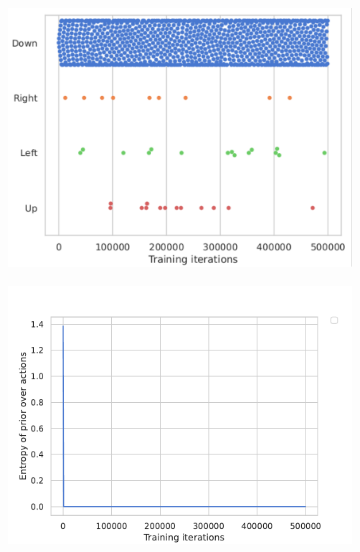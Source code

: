 \documentclass[twoside,11pt]{article}
\providecommand{\DIFaddbegin}{} %
\begin{document}
\DIFaddbegin \begin{figure}[H]
    \centering
    \begin{subfigure}{.4\textwidth}
        \centering
        \includegraphics[draft=false,width=\linewidth]{ActionPicked_efe_3}
        \caption{}\label{fig:action_picked_efe}
    \end{subfigure}%
    \begin{subfigure}{.4\textwidth}
        \centering
        \includegraphics[draft=false,width=\linewidth]{EntropyPriorActions_efe_3}
        \caption{}\label{fig:entropy_action_efe}
    \end{subfigure}
    \begin{subfigure}{.4\textwidth}

\end{subfigure}
\end{figure}
\end{document}
